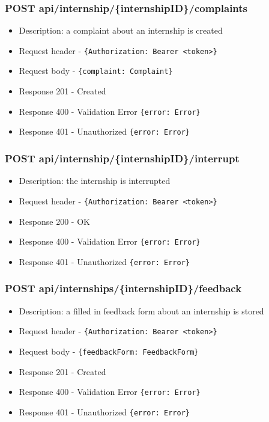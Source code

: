 \subsubsection{POST api/internship/\{internshipID\}/complaints}
\begin{itemize}
    \item Description: a complaint about an internship is created
    \item Request header - \verb|{Authorization: Bearer <token>}|
    \item Request body - \verb|{complaint: Complaint}|
    \item Response 201 - Created
    \item Response 400 - Validation Error \verb|{error: Error}|
    \item Response 401 - Unauthorized \verb|{error: Error}|
\end{itemize}

\subsubsection{POST api/internship/\{internshipID\}/interrupt}
\begin{itemize}
    \item Description: the internship is interrupted
    \item Request header - \verb|{Authorization: Bearer <token>}|
    \item Response 200 - OK
    \item Response 400 - Validation Error \verb|{error: Error}|
    \item Response 401 - Unauthorized \verb|{error: Error}|
\end{itemize}

\subsubsection{POST api/internships/\{internshipID\}/feedback}
\begin{itemize}
    \item Description: a filled in feedback form about an internship is stored
    \item Request header - \verb|{Authorization: Bearer <token>}|
    \item Request body - \verb|{feedbackForm: FeedbackForm}|
    \item Response 201 - Created
    \item Response 400 - Validation Error \verb|{error: Error}|
    \item Response 401 - Unauthorized \verb|{error: Error}|
\end{itemize}

